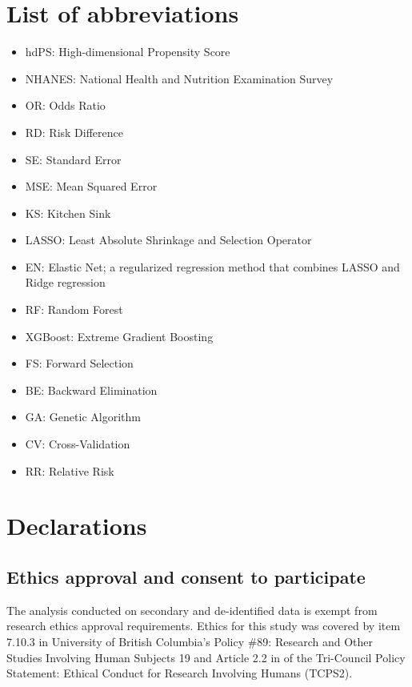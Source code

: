 \documentclass[sn-vancouver,Numbered,lineno,pdflatex]{sn-jnl}
\providecommand{\tightlist}{%
  \setlength{\itemsep}{0pt}\setlength{\parskip}{0pt}}
\begin{document}
\section*{List of abbreviations}\label{list-of-abbreviations}

\begin{itemize}
\tightlist
\item
  hdPS: High-dimensional Propensity Score
\item
  NHANES: National Health and Nutrition Examination Survey
\item
  OR: Odds Ratio
\item
  RD: Risk Difference
\item
  SE: Standard Error
\item
  MSE: Mean Squared Error
\item
  KS: Kitchen Sink
\item
  LASSO: Least Absolute Shrinkage and Selection Operator
\item
  EN: Elastic Net; a regularized regression method that combines LASSO
  and Ridge regression
\item
  RF: Random Forest
\item
  XGBoost: Extreme Gradient Boosting
\item
  FS: Forward Selection
\item
  BE: Backward Elimination
\item
  GA: Genetic Algorithm
\item
  CV: Cross-Validation
\item
  RR: Relative Risk
\end{itemize}

\section*{Declarations}\label{declarations}

\subsection*{Ethics approval and consent to
participate}\label{ethics-approval-and-consent-to-participate}

The analysis conducted on secondary and de-identified data is exempt
from research ethics approval requirements. Ethics for this study was
covered by item 7.10.3 in University of British Columbia's Policy \#89:
Research and Other Studies Involving Human Subjects 19 and Article 2.2
in of the Tri-Council Policy Statement: Ethical Conduct for Research
Involving Humans (TCPS2).
\end{document}
